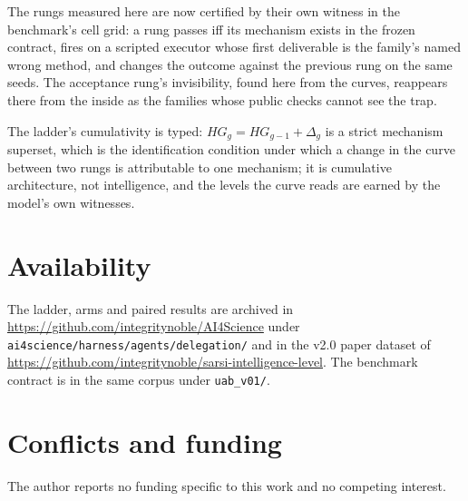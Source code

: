 \documentclass[11pt]{article}
\theoremstyle{definition}
\begin{document}
The rungs measured here are now certified by their own witness in the benchmark's cell grid: a rung passes iff its mechanism exists in the frozen contract, fires on a scripted executor whose first deliverable is the family's named wrong method, and changes the outcome against the previous rung on the same seeds. The acceptance rung's invisibility, found here from the curves, reappears there from the inside as the families whose public checks cannot see the trap.

The ladder's cumulativity is typed: $HG_g = HG_{g-1} + \Delta_g$ is a strict mechanism superset, which is the identification condition under which a change in the curve between two rungs is attributable to one mechanism; it is cumulative architecture, not intelligence, and the levels the curve reads are earned by the model's own witnesses.

\section*{Availability}

The ladder, arms and paired results are archived in \url{https://github.com/integritynoble/AI4Science} under \texttt{ai4science/harness/agents/delegation/} and in the v2.0 paper dataset of \url{https://github.com/integritynoble/sarsi-intelligence-level}. The benchmark contract is in the same corpus under \texttt{uab\_v01/}.

\section*{Conflicts and funding}

The author reports no funding specific to this work and no competing interest.



\end{document}
